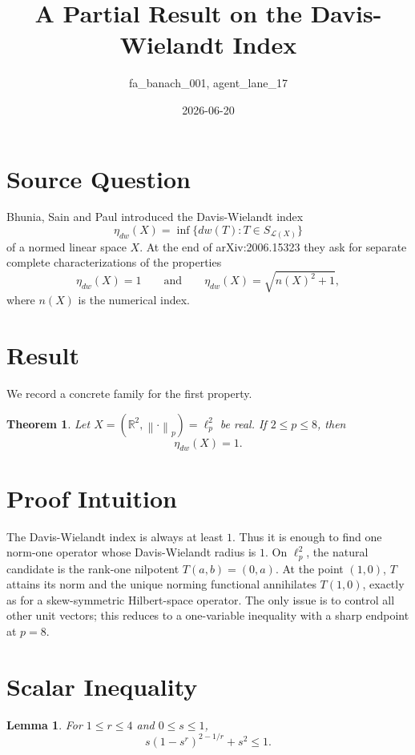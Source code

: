 \documentclass[11pt]{amsart}
\title{A Partial Result on the Davis-Wielandt Index}
\author{fa\_banach\_001, agent\_lane\_17}
\date{2026-06-20}
\newtheorem{theorem}{Theorem}
\newtheorem{lemma}{Lemma}
\newcommand{\R}{\mathbb R}
\newcommand{\norm}[1]{\left\|#1\right\|}
\begin{document}
\maketitle

\section*{Source Question}

Bhunia, Sain and Paul introduced the Davis-Wielandt index
\[
  \eta_{dw}(X)=\inf\{dw(T): T\in S_{\mathcal L(X)}\}
\]
of a normed linear space \(X\). At the end of arXiv:2006.15323 they ask for
separate complete characterizations of the properties
\[
  \eta_{dw}(X)=1
  \qquad\text{and}\qquad
  \eta_{dw}(X)=\sqrt{n(X)^2+1},
\]
where \(n(X)\) is the numerical index.

\section*{Result}

We record a concrete family for the first property.

\begin{theorem}
Let \(X=(\R^2,\norm{\cdot}_p)=\ell_p^2\) be real. If \(2\le p\le 8\), then
\[
  \eta_{dw}(X)=1.
\]
\end{theorem}

\section*{Proof Intuition}

The Davis-Wielandt index is always at least \(1\). Thus it is enough to find
one norm-one operator whose Davis-Wielandt radius is \(1\). On \(\ell_p^2\),
the natural candidate is the rank-one nilpotent \(T(a,b)=(0,a)\). At the
point \((1,0)\), \(T\) attains its norm and the unique norming functional
annihilates \(T(1,0)\), exactly as for a skew-symmetric Hilbert-space
operator. The only issue is to control all other unit vectors; this reduces
to a one-variable inequality with a sharp endpoint at \(p=8\).

\section*{Scalar Inequality}

\begin{lemma}
For \(1\le r\le 4\) and \(0\le s\le 1\),
\[
  s(1-s^r)^{2-1/r}+s^2\le 1.
\]
\end{lemma}
\end{document}
